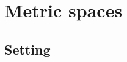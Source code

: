 \documentclass[alpha-refs]{wiley-article}
\begin{document}





\section{Metric spaces}\label{s:2}


\subsection{Setting}\label{s:new-setting} %
\end{document}
